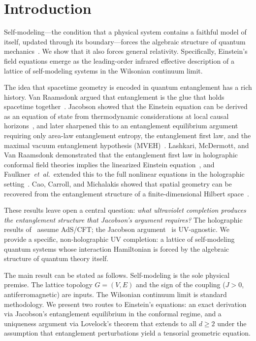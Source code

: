 \section{Introduction}
\label{sec:introduction}

Self-modeling---the condition that a physical system contains a faithful
model of itself, updated through its boundary---forces the algebraic
structure of quantum mechanics~\cite{Paper5}. We show that it also forces
general relativity. Specifically, Einstein's field equations emerge as the
leading-order infrared effective description of a lattice of self-modeling
systems in the Wilsonian continuum limit.

The idea that spacetime geometry is encoded in quantum entanglement has a
rich history. Van Raamsdonk argued that entanglement is the glue that
holds spacetime together~\cite{VanRaamsdonk2010}. Jacobson showed that the
Einstein equation can be derived as an equation of state from
thermodynamic considerations at local causal
horizons~\cite{Jacobson1995}, and later sharpened this to an entanglement
equilibrium argument requiring only area-law entanglement entropy, the
entanglement first law, and the maximal vacuum entanglement hypothesis
(MVEH)~\cite{Jacobson2016}. Lashkari, McDermott, and Van Raamsdonk
demonstrated that the entanglement first law in holographic conformal
field theories implies the linearized Einstein equation~\cite{LMVR2014},
and Faulkner~\textit{et~al.}\ extended this to the full nonlinear
equations in the holographic setting~\cite{Faulkner2014}. Cao, Carroll,
and Michalakis showed that spatial geometry can be recovered from the
entanglement structure of a finite-dimensional Hilbert
space~\cite{CCM2017}.

These results leave open a central question: \emph{what ultraviolet
completion produces the entanglement structure that Jacobson's argument
requires?} The holographic results of~\cite{LMVR2014,Faulkner2014} assume
AdS/CFT; the Jacobson argument~\cite{Jacobson2016} is UV-agnostic. We
provide a specific, non-holographic UV completion: a lattice of
self-modeling quantum systems whose interaction Hamiltonian is forced by
the algebraic structure of quantum theory itself.

The main result can be stated as follows. Self-modeling is the sole
physical premise. The lattice topology $G = (V, E)$ and the sign of
the coupling ($J > 0$, antiferromagnetic) are inputs. The Wilsonian
continuum limit is standard methodology. We present two routes to
Einstein's equations: an exact derivation via Jacobson's entanglement
equilibrium in the conformal regime, and a uniqueness argument via
Lovelock's theorem that extends to all $d \geq 2$ under the assumption
that entanglement perturbations yield a tensorial geometric equation.

